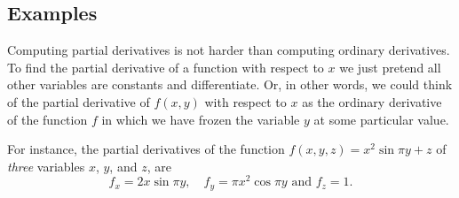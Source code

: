 \subsection{Examples}
\label{sec:partial-derivatives-examples}
Computing partial derivatives is not harder than computing ordinary derivatives.
To find the partial derivative of a function with respect to $x$ we just pretend
all other variables are constants and differentiate.  Or, in other words, we
could think of the partial derivative of $f(x,y)$ with respect to $x$ as the
ordinary derivative of the function $f$ in which we have frozen the variable $y$
at some particular value.

For instance, the partial derivatives of the function $f(x, y, z) = x^2\sin\pi
y+z$ of \emph{three} variables $x$, $y$, and $z$, are
\[
f_x = 2x\sin\pi y,\quad f_y = \pi x^2\cos\pi y\text{ and } f_z = 1.
\]



